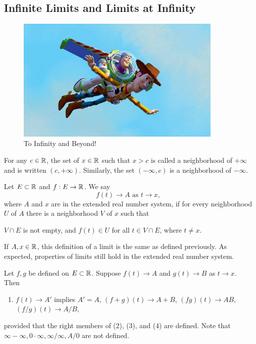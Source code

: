 \documentclass{article}
\begin{document}
\subsection{Infinite Limits and Limits at Infinity}
\begin{figure}
    \centering
    \includegraphics[width=10cm]{toinfinity.jpg}
    \caption{To Infinity and Beyond!}
    \label{fig:buzz}
\end{figure}
\begin{definition}
    For any $c\in\mathbb R$, the set of $x\in\mathbb R$ such that $x>c$ is called a neighborhood of $+\infty$ and is written $(c,+\infty)$. Similarly, the set $(-\infty, c)$ is a neighborhood of $-\infty$.
\end{definition}
\begin{definition}
    Let $E\subset \mathbb R$ and $f:E\rightarrow\mathbb R$. We say \[f(t)\rightarrow A\textrm{ as }t\rightarrow x,\]where $A$ and $x$ are in the extended real number system, if for every neighborhood $U$ of $A$ there is a neighborhood $V$ of $x$ such that 
    \begin{enumerate}
        \ii $V\cap E$ is not empty, and
        \ii $f(t)\in U$ for all $t\in V\cap E$, where $t\neq x$.
    \end{enumerate}
\end{definition}
\begin{remark}
    If $A,x\in\mathbb R$, this definition of a limit is the same as defined previously. As expected, properties of limits still hold in the extended real number system.
\end{remark}
\begin{theorem}
    Let $f,g$ be defined on $E\subset \mathbb R$. Suppose $f(t)\rightarrow A$ and $g(t)\rightarrow B$ as $t\rightarrow x$. Then 
    \begin{enumerate}
        \item $f(t)\rightarrow A'$ implies $A'=A$,
        \ii $(f+g)(t)\rightarrow A+B$,
        \ii $(fg)(t)\rightarrow AB$,
        \ii $(f/g)(t)\rightarrow A/B$,
    \end{enumerate}
    provided that the right members of (2), (3), and (4) are defined. Note that $\infty-\infty,0\cdot \infty, \infty/\infty, A/0$ are not defined.
\end{theorem}   
\newpage 
\end{document}
